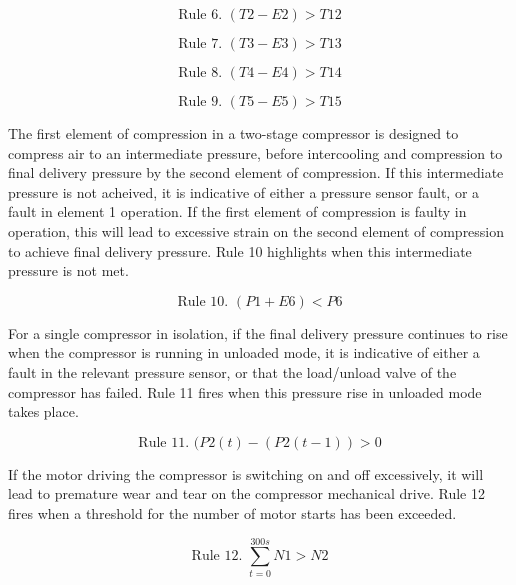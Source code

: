 \begin{equation}
\text{Rule 6. } (T2 - E2) > T12
\label{eq:rule6}
\end{equation}

\begin{equation}
\text{Rule 7. } (T3 - E3) > T13
\label{eq:rule7}
\end{equation}

\begin{equation}
\text{Rule 8. } (T4 - E4) > T14
\label{eq:rule8}
\end{equation}

\begin{equation}
\text{Rule 9. } (T5 - E5) > T15
\label{eq:rule9}
\end{equation}

The first element of compression in a two-stage compressor is designed to compress air to an intermediate pressure, before intercooling and compression to final delivery pressure by the second element of compression. If this intermediate pressure is not acheived, it is indicative of either a pressure sensor fault, or a fault in element 1 operation. If the first element of compression is faulty in operation, this will lead to excessive strain on the second element of compression to achieve final delivery pressure. Rule 10 highlights when this intermediate pressure is not met.

\begin{equation}
\text{Rule 10. } (P1 + E6) < P6
\label{eq:rule10}
\end{equation}

For a single compressor in isolation, if the final delivery pressure continues to rise when the compressor is running in unloaded mode, it is indicative of either a fault in the relevant pressure sensor, or that the load/unload valve of the compressor has failed. Rule 11 fires when this pressure rise in unloaded mode takes place.

\begin{equation}
\text{Rule 11. } (P2(t) - (P2(t-1)) > 0
\label{eq:rule11}
\end{equation}

If the motor driving the compressor is switching on and off excessively, it will lead to premature wear and tear on the compressor mechanical drive. Rule 12 fires when a threshold for the number of motor starts has been exceeded.

\begin{equation}
\text{Rule 12. } \sum_{t = 0}^{300s}N1 > N2
\label{eq:rule12}
\end{equation}

